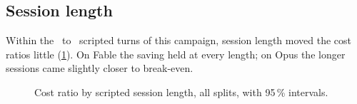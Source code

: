 \FloatBarrier
\subsection{Session length}

Within the \MinTurns\ to \MaxTurns\ scripted turns of this campaign, session length moved the cost ratios little (\cref{fig:band}).
On Fable the saving held at every length; on Opus the longer sessions came slightly closer to break-even.

\begin{figure}[htbp]
\centering
{}\par\smallskip

\caption{Cost ratio by scripted session length, all splits, with 95\,\% intervals.}
\label{fig:band}
\end{figure}
\FloatBarrier
